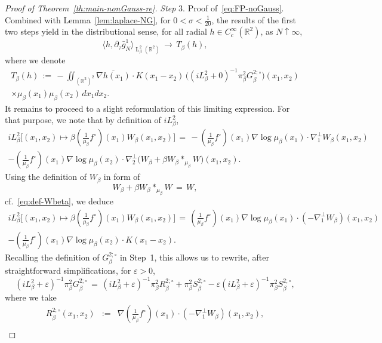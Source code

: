 \documentclass[a4paper,11pt,reqno,noindent]{amsart}
\theoremstyle{plain}
\numberwithin{equation}{section}
\newcommand{\e}{\varepsilon}
\newcommand{\R}{\mathbb R}
\newcommand{\3}{|\!|\!|}
\newcommand{\Ld}{\operatorname{L}}
\newcommand{\step}[1]{\noindent \textit{Step} #1.}
\begin{document}
\begin{proof}[Proof of Theorem~\ref{th:main-nonGauss-re}]
\medskip
\step3 Proof of~\eqref{eq:FP-noGauss}.\\
Combined with Lemma~\ref{lem:laplace-NG}, for $0<\sigma<\frac1{20}$, the results of the first two steps yield in the distributional sense, for all radial $h\in C^\infty_c(\R^2)$, as $N\uparrow\infty$,
\begin{equation*}
\langle h,\partial_\tau\bar g_N^1\rangle_{\Ld^2_\beta(\R^2)}\,\to\,T_\beta(h),
\end{equation*}
where we denote
\begin{multline}\label{eq:preconcl-noGauss}
T_\beta(h)\,:=\,-\iint_{(\R^2)^2}\overline{\nabla h(x_1)}\cdot K(x_1-x_2)\,\big((iL^2_\beta+0)^{-1}\pi_\beta^2G_{\beta}^{2;\circ}\big)(x_1,x_2)\\
\times\mu_\beta(x_1)\mu_\beta(x_2)\, dx_1dx_2.
\end{multline}
It remains to proceed to a slight reformulation of this limiting expression.
For that purpose, we note that by definition of $iL_\beta^{2}$,
\begin{multline*}
iL_\beta^2\big[(x_1,x_2)\mapsto \beta(\tfrac1{\mu_\beta}f^\circ)(x_1)W_\beta(x_1,x_2)\big]
\,=\,
-(\tfrac1{\mu_\beta}f^\circ)(x_1)\nabla\log\mu_\beta(x_1)\cdot\nabla_1^\bot W_\beta(x_1,x_2)\\
-(\tfrac1{\mu_\beta}f^\circ)(x_1)\nabla\log\mu_\beta(x_2)\cdot\nabla_2^\bot\Big( W_\beta+\beta W_\beta\ast_{\mu_\beta}W\Big)(x_1,x_2).
\end{multline*}
Using the definition of $W_\beta$ in form of
\[W_\beta+\beta W_\beta\ast_{\mu_\beta}W\,=\,W,\]
cf.~\eqref{eq:def-Wbeta}, we deduce
\begin{multline*}
iL_\beta^2\big[(x_1,x_2)\mapsto \beta(\tfrac1{\mu_\beta}f^\circ)(x_1)W_\beta(x_1,x_2)\big]
\,=\,
(\tfrac1{\mu_\beta}f^\circ)(x_1)\nabla\log\mu_\beta(x_1)\cdot(-\nabla_1^\bot W_\beta)(x_1,x_2)\\
-(\tfrac1{\mu_\beta}f^\circ)(x_1)\nabla\log\mu_\beta(x_2)\cdot K(x_1-x_2).
\end{multline*}
Recalling the definition of $G_\beta^{2;\circ}$ in Step~1, this allows us to rewrite, after straightforward simplifications, for $\e>0$,
\begin{equation*}
(iL_\beta^2+\e)^{-1}\pi_\beta^2G_{\beta}^{2;\circ}
\,=\,(iL_\beta^2+\e)^{-1}\pi_\beta^2R_\beta^{2;\circ}+\pi_\beta^2S_\beta^{2;\circ}
-\e(iL_\beta^2+\e)^{-1}\pi_\beta^2S_\beta^{2;\circ},
\end{equation*}
where we take
\begin{eqnarray*}
R_\beta^{2;\circ}(x_1,x_2)&:=&\nabla(\tfrac1{\mu_\beta} f^\circ)(x_1)\cdot(-\nabla^\bot_1W_\beta)(x_1,x_2),\\

\end{eqnarray*}
\end{proof}
\end{document}
